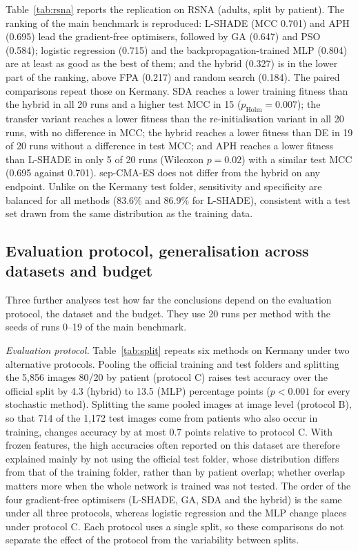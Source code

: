 \documentclass[preprint,12pt]{elsarticle}
\begin{document}
Table~\ref{tab:rsna} reports the replication on RSNA (adults, split by patient). The ranking of the main benchmark is reproduced: L-SHADE (MCC 0.701) and APH (0.695) lead the gradient-free optimisers, followed by GA (0.647) and PSO (0.584); logistic regression (0.715) and the backpropagation-trained MLP (0.804) are at least as good as the best of them; and the hybrid (0.327) is in the lower part of the ranking, above FPA (0.217) and random search (0.184). The paired comparisons repeat those on Kermany. SDA reaches a lower training fitness than the hybrid in all 20 runs and a higher test MCC in 15 ($p_{\mathrm{Holm}}=0.007$); the transfer variant reaches a lower fitness than the re-initialisation variant in all 20 runs, with no difference in MCC; the hybrid reaches a lower fitness than DE in 19 of 20 runs without a difference in test MCC; and APH reaches a lower fitness than L-SHADE in only 5 of 20 runs (Wilcoxon $p=0.02$) with a similar test MCC (0.695 against 0.701). sep-CMA-ES does not differ from the hybrid on any endpoint. Unlike on the Kermany test folder, sensitivity and specificity are balanced for all methods (83.6\% and 86.9\% for L-SHADE), consistent with a test set drawn from the same distribution as the training data.



\subsection{Evaluation protocol, generalisation across datasets and budget}\label{sec:robust}
Three further analyses test how far the conclusions depend on the evaluation protocol, the dataset and the budget. They use 20 runs per method with the seeds of runs 0--19 of the main benchmark.

\emph{Evaluation protocol.} Table~\ref{tab:split} repeats six methods on Kermany under two alternative protocols. Pooling the official training and test folders and splitting the 5,856 images 80/20 by patient (protocol C) raises test accuracy over the official split by 4.3 (hybrid) to 13.5 (MLP) percentage points ($p<0.001$ for every stochastic method). Splitting the same pooled images at image level (protocol B), so that 714 of the 1,172 test images come from patients who also occur in training, changes accuracy by at most 0.7 points relative to protocol C. With frozen features, the high accuracies often reported on this dataset are therefore explained mainly by not using the official test folder, whose distribution differs from that of the training folder, rather than by patient overlap; whether overlap matters more when the whole network is trained was not tested. The order of the four gradient-free optimisers (L-SHADE, GA, SDA and the hybrid) is the same under all three protocols, whereas logistic regression and the MLP change places under protocol C. Each protocol uses a single split, so these comparisons do not separate the effect of the protocol from the variability between splits.
\end{document}
